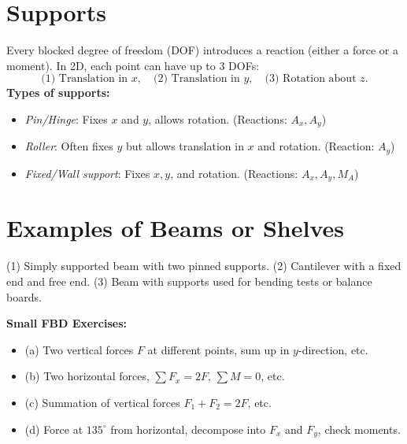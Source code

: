 \documentclass{article}
\begin{document}
\begin{center}
\end{center}

\section{Supports}
Every blocked degree of freedom (DOF) introduces a reaction (either a force or a moment). 
In 2D, each point can have up to 3 DOFs:
\[
\text{(1) Translation in } x, \quad
\text{(2) Translation in } y, \quad
\text{(3) Rotation about } z.
\]
\textbf{Types of supports:}
\begin{itemize}
\item \emph{Pin/Hinge}: Fixes $x$ and $y$, allows rotation. (Reactions: $A_x, A_y$)
\item \emph{Roller}: Often fixes $y$ but allows translation in $x$ and rotation. (Reaction: $A_y$)
\item \emph{Fixed/Wall support}: Fixes $x, y$, and rotation. (Reactions: $A_x, A_y, M_A$)
\end{itemize}

\section{Examples of Beams or Shelves}
(1) Simply supported beam with two pinned supports.  
(2) Cantilever with a fixed end and free end.  
(3) Beam with supports used for bending tests or balance boards.

\textbf{Small FBD Exercises:}
\begin{itemize}
\item (a) Two vertical forces $F$ at different points, sum up in $y$-direction, etc.
\item (b) Two horizontal forces, $\sum F_x = 2F$, $\sum M = 0$, etc.
\item (c) Summation of vertical forces $F_1 + F_2 = 2F$, etc.
\item (d) Force at $135^\circ$ from horizontal, decompose into $F_x$ and $F_y$, check moments.
\end{itemize}
\end{document}
